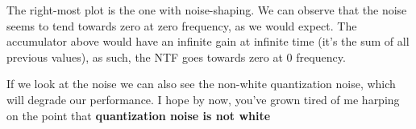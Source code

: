 \begin{Shaded}
\begin{Highlighting}[]
\OperatorTok{=} \OperatorTok{**}
    \OperatorTok{==} \NormalTok{):}
          \OperatorTok{\textgreater{}=}   \OperatorTok{{-}}
\OperatorTok{=} \OperatorTok{/}\OperatorTok{{-}}\NormalTok{)}
     \OperatorTok{/}\OperatorTok{*}\OperatorTok{{-}}\NormalTok{,}\NormalTok{))}

\OperatorTok{=} 
\OperatorTok{=}
\OperatorTok{=}
 \NormalTok{(}
\OperatorTok{=}\NormalTok{ x[n}\OperatorTok{{-}}\NormalTok{] }\OperatorTok{+}\OperatorTok{{-}}\NormalTok{y\_sd[n}\OperatorTok{{-}}\NormalTok{])}
\OperatorTok{=}
        \OperatorTok{+}\OperatorTok{*}\OperatorTok{/}\NormalTok{(}\OperatorTok{*}\OperatorTok{**}
\end{Highlighting}
\end{Shaded}

The right-most plot is the one with noise-shaping. We can observe that
the noise seems to tend towards zero at zero frequency, as we would
expect. The accumulator above would have an infinite gain at infinite
time (it's the sum of all previous values), as such, the NTF goes
towards zero at 0 frequency.

If we look at the noise we can also see the non-white quantization
noise, which will degrade our performance. I hope by now, you've grown
tired of me harping on the point that \textbf{quantization noise is not
white}


